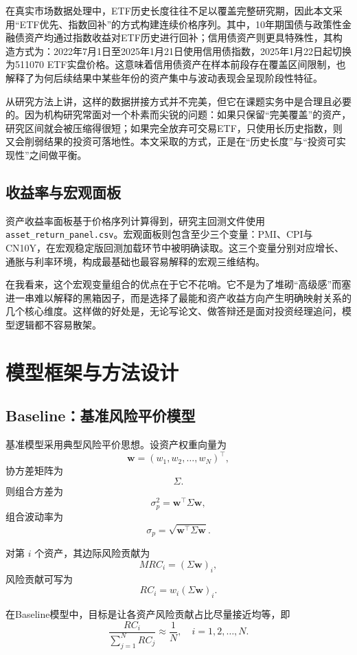 \documentclass[12pt,a4paper]{ctexart}
\begin{document}
在真实市场数据处理中，ETF历史长度往往不足以覆盖完整研究期，因此本文采用“ETF优先、指数回补”的方式构建连续价格序列。其中，10年期国债与政策性金融债资产均通过指数收益对ETF历史进行回补；信用债资产则更具特殊性，其构造方式为：2022年7月1日至2025年1月21日使用信用债指数，2025年1月22日起切换为511070 ETF实盘价格。这意味着信用债资产在样本前段存在覆盖区间限制，也解释了为何后续结果中某些年份的资产集中与波动表现会呈现阶段性特征。

从研究方法上讲，这样的数据拼接方式并不完美，但它在课题实务中是合理且必要的。因为机构研究常面对一个朴素而尖锐的问题：如果只保留“完美覆盖”的资产，研究区间就会被压缩得很短；如果完全放弃可交易ETF，只使用长历史指数，则又会削弱结果的投资可落地性。本文采取的方式，正是在“历史长度”与“投资可实现性”之间做平衡。

\subsection{收益率与宏观面板}

资产收益率面板基于价格序列计算得到，研究主回测文件使用 \texttt{asset\_return\_panel.csv}。宏观面板则包含至少三个变量：PMI、CPI与CN10Y，在宏观稳定版回测加载环节中被明确读取。这三个变量分别对应增长、通胀与利率环境，构成最基础也最容易解释的宏观三维结构。

在我看来，这个宏观变量组合的优点在于它不花哨。它不是为了堆砌“高级感”而塞进一串难以解释的黑箱因子，而是选择了最能和资产收益方向产生明确映射关系的几个核心维度。这样做的好处是，无论写论文、做答辩还是面对投资经理追问，模型逻辑都不容易散架。

\section{模型框架与方法设计}

\subsection{Baseline：基准风险平价模型}

基准模型采用典型风险平价思想。设资产权重向量为
\[
\bm{w} = (w_1,w_2,\dots,w_N)^\top,
\]
协方差矩阵为
\[
\Sigma.
\]
则组合方差为
\[
\sigma_p^2 = \bm{w}^\top \Sigma \bm{w},
\]
组合波动率为
\[
\sigma_p = \sqrt{\bm{w}^\top \Sigma \bm{w}}.
\]

对第 \(i\) 个资产，其边际风险贡献为
\[
MRC_i = (\Sigma \bm{w})_i,
\]
风险贡献可写为
\[
RC_i = w_i(\Sigma \bm{w})_i.
\]

在Baseline模型中，目标是让各资产风险贡献占比尽量接近均等，即
\[
\frac{RC_i}{\sum_{j=1}^{N} RC_j} \approx \frac{1}{N}, \quad i=1,2,\dots,N.
\]
\end{document}
